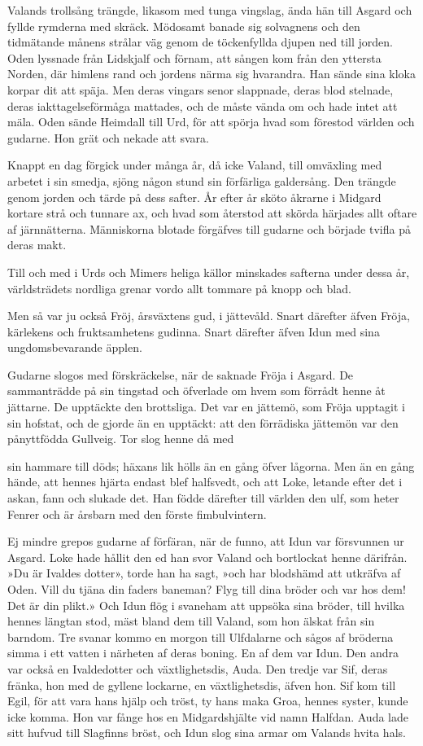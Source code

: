 Valands trollsång trängde, likasom med tunga vingslag, ända hän till
Asgard och fyllde rymderna med skräck. Mödosamt banade sig solvagnens
och den tidmätande månens strålar väg genom de töckenfyllda djupen ned
till jorden. Oden lyssnade från Lidskjalf och förnam, att sången kom
från den yttersta Norden, där himlens rand och jordens närma sig
hvarandra. Han sände sina kloka korpar dit att späja. Men deras vingars
senor slappnade, deras blod stelnade, deras iakttagelseförmåga mattades,
och de måste vända om och hade intet att mäla. Oden sände Heimdall till
Urd, för att spörja hvad som förestod världen och gudarne. Hon grät och
nekade att svara.

Knappt en dag förgick under många år, då icke Valand, till omväxling med
arbetet i sin smedja, sjöng någon stund sin förfärliga galdersång. Den
trängde genom jorden och tärde på dess safter. År efter år sköto åkrarne
i Midgard kortare strå och tunnare ax, och hvad som återstod att skörda
härjades allt oftare af järnnätterna. Människorna blotade förgäfves till
gudarne och började tvifla på deras makt.

Till och med i Urds och Mimers heliga källor minskades safterna under
dessa år, världsträdets nordliga grenar vordo allt tommare på knopp och
blad.

Men så var ju också Fröj, årsväxtens gud, i jättevåld. Snart därefter
äfven Fröja, kärlekens och fruktsamhetens gudinna. Snart därefter äfven
Idun med sina ungdomsbevarande äpplen.

Gudarne slogos med förskräckelse, när de saknade Fröja i Asgard. De
sammanträdde på sin tingstad och öfverlade om hvem som förrådt henne åt
jättarne. De upptäckte den brottsliga. Det var en jättemö, som Fröja
upptagit i sin hofstat, och de gjorde än en upptäckt: att den förrädiska
jättemön var den pånyttfödda Gullveig. Tor slog henne då med

sin hammare till döds; häxans lik hölls än en gång öfver lågorna. Men än
en gång hände, att hennes hjärta endast blef halfsvedt, och att Loke,
letande efter det i askan, fann och slukade det. Han födde därefter till
världen den ulf, som heter Fenrer och är årsbarn med den förste
fimbulvintern.

Ej mindre grepos gudarne af förfäran, när de funno, att Idun var
försvunnen ur Asgard. Loke hade hållit den ed han svor Valand och
bortlockat henne därifrån. »Du är Ivaldes dotter», torde han ha sagt,
»och har blodshämd att utkräfva af Oden. Vill du tjäna din faders
baneman? Flyg till dina bröder och var hos dem! Det är din plikt.» Och
Idun flög i svaneham att uppsöka sina bröder, till hvilka hennes längtan
stod, mäst bland dem till Valand, som hon älskat från sin barndom. Tre
svanar kommo en morgon till Ulfdalarne och sågos af bröderna simma i ett
vatten i närheten af deras boning. En af dem var Idun. Den andra var
också en Ivaldedotter och växtlighetsdis, Auda. Den tredje var Sif,
deras fränka, hon med de gyllene lockarne, en växtlighetsdis, äfven hon.
Sif kom till Egil, för att vara hans hjälp och tröst, ty hans maka Groa,
hennes syster, kunde icke komma. Hon var fånge hos en Midgardshjälte vid
namn Halfdan. Auda lade sitt hufvud till Slagfinns bröst, och Idun slog
sina armar om Valands hvita hals.

